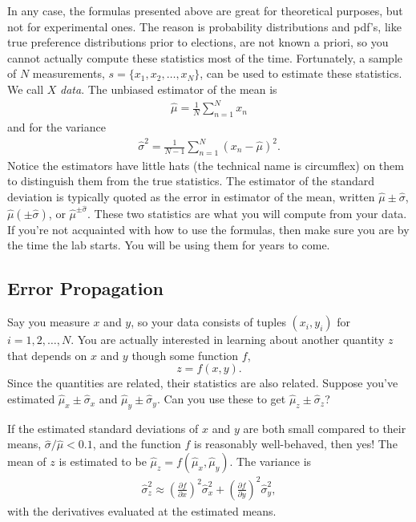 \documentclass[addpoints]{physlabs}  %
\begin{document}
\begin{labsection}
\begin{theory}
In any case, the formulas presented above are great for theoretical purposes, but not for experimental ones.
The reason is probability distributions and pdf's, like true preference distributions prior to elections, are not known a priori, so you cannot actually compute these statistics most of the time.
Fortunately, a sample of $N$ measurements, $s=\{x_1,x_2,\dots,x_N\}$, can be used to estimate these statistics.
We call $X$ \textit{data}.
The unbiased estimator of the mean is
\begin{align}
    \hat\mu = \frac{1}{N}\sum_{n=1}^N
x_n\end{align}
and for the variance
\begin{align}
    \hat\sigma^2 = \frac{1}{N-1}\sum_{n=1}^N(x_n-\hat \mu)^2.
\end{align}
Notice the estimators have little hats (the technical name is circumflex) on them to distinguish them from the true statistics.
The estimator of the standard deviation is typically quoted as the error in estimator of the mean, written $\hat\mu\pm\hat\sigma$, $\hat\mu(\pm\hat\sigma)$, or $\hat\mu^{\pm\hat\sigma}$.
These two statistics are what you will compute from your data.
If you're not acquainted with how to use the formulas, then make sure you are by the time the lab starts.
You will be using them for years to come.

\subsection*{Error Propagation}
Say you measure $x$ and $y$, so your data consists of tuples $(x_i,y_i)$ for $i=1,2,\dots,N$.
You are actually interested in learning about another quantity $z$ that depends on $x$ and $y$ though some function $f$,
\begin{equation}
    z = f(x,y).
\end{equation}
Since the quantities are related, their statistics are also related.
Suppose you've estimated $\hat\mu_x\pm\hat\sigma_x$ and $\hat\mu_y\pm\hat\sigma_y$.
Can you use these to get $\hat\mu_z\pm\hat\sigma_z$?

If the estimated standard deviations of $x$ and $y$ are both small compared to their means, $\hat\sigma/\hat\mu<0.1$, and the function $f$ is reasonably well-behaved, then yes!
The mean of $z$ is estimated to be $\hat\mu_z=f(\hat\mu_x,\hat\mu_y)$.
The variance is
\begin{align}
    \hat{\sigma}_z^2 \approx \left(\frac{\partial f}{\partial x}\right)^2\hat\sigma_x^2+\left(\frac{\partial f}{\partial y}\right)^2\hat\sigma_y^2,
\end{align}
with the derivatives evaluated at the estimated means.


\end{theory}
\end{labsection}
\end{document}
